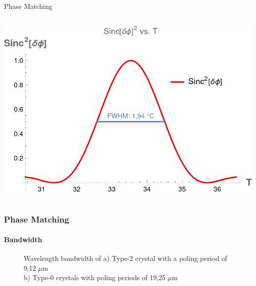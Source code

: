 \documentclass[serif,8pt]{beamer}
\begin{document}
\begin{frame}{Phase Matching}
\begin{columns}[t]
        \includegraphics[width=0.8\columnwidth]{PMT_Type0G6.png}
    \end{columns}
\end{frame}

\begin{frame}[t]
	\frametitle{Phase Matching}
	\framesubtitle{Bandwidth}
	\begin{figure}[!ht]
	  \centering
	  \caption{Wavelength bandwidth of a) Type-2 crystal with a poling period of 9,12 $\mu$m\\ b) Type-0 crystals with poling periods of 19,25 $\mu$m}
	  \quad
	  \label{fig:CompT0a2}
	\end{figure}
\end{frame}

\end{document}
